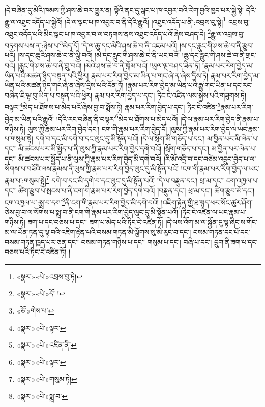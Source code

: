 །དེ་བཞིན་དུ་མེའི་ཁམས་ཀྱི་ཤས་ཆེ་བར་གྱུར་ན། ལྟོའི་ནང་དུ་ལྒང་པ་ཁ་འབྱར་བའི་རེག་བྱའི་ཁྱད་པར་སྐྱེ་སྟེ། དེའི་རྒྱུ་ལ་འཐུང་འདོད་པ་སྐྱེའོ། །དེ་ལ་ལྒང་པ་ཁ་འབྱར་བ་ནི་དེའི་རྒྱུའོ། །འཐུང་འདོད་པ་ནི་:འབྲས་བུ་སྟེ།\footnote{«སྣར་»«པེ་»འབྲས་བུ་ཏེ།} འབྲས་བུ་འཐུང་འདོད་པའི་མིང་ལྒང་པ་ཁ་འབྱར་བ་ལ་བཏགས་ནས་འཐུང་འདོད་པའོ་ཞེས་བཤད་དེ། \footnote{«སྣར་»«པེ་»དོ། ། }རྒྱུ་ལ་འབྲས་བུ་བཏགས་པས་ན་:ཉེས་པ་\footnote{«ཅོ་»གེས་པ་}མེད་དོ། །དེ་ལ་ཆུ་དང་མེའི་ཤས་ཆེ་བ་ནི་འཇམ་པའོ། །ས་དང་རླུང་གི་ཤས་ཆེ་བ་ནི་རྩུབ་པའོ། །ས་དང་ཆུའི་ཤས་ཆེ་བ་ནི་ལྕི་བའོ། །མེ་དང་རླུང་གི་ཤས་ཆེ་བ་ནི་ཡང་བའོ། །ཆུ་དང་རླུང་གི་ཤས་ཆེ་བ་ནི་གྲང་བའོ། །རླུང་གི་ཤས་ཆེ་བ་ནི་བྲུ་བའོ། །མེའི་ཤས་ཆེ་བ་ནི་སྐོམ་པའོ། །ཡུལ་ལྔ་བཤད་ཟིན་ཏོ། །རྣམ་པར་རིག་བྱེད་མ་ཡིན་པའི་མཚན་ཉིད་བསྟན་པའི་ཕྱིར། རྣམ་པར་རིག་བྱེད་མ་ཡིན་པ་གང་ཞེ་ན་ཞེས་དྲིས་ཏེ། རྣམ་པར་རིག་བྱེད་མ་ཡིན་པའི་མཚན་ཉིད་གང་ཞེ་ན་ཞེས་དྲིས་པའི་དོན་ཏོ། །རྣམ་པར་རིག་བྱེད་མ་ཡིན་པའི་རྒྱུ་གང་ཡིན་པ་དང་རང་བཞིན་ཇི་ལྟ་བུ་ཡིན་པ་བསྟན་པའི་ཕྱིར། རྣམ་པར་རིག་བྱེད་པ་དང་། ཏིང་ངེ་འཛིན་ལས་སྐྱེས་པའི་གཟུགས་ཏེ། བལྟར་\footnote{«སྣར་»«པེ་»ལྟར་}མེད་པ་ཐོགས་པ་མེད་པའོ་ཞེས་བྱ་བ་སྨོས་ཏེ། རྣམ་པར་རིག་བྱེད་པ་དང་། ཏིང་ངེ་འཛིན་\footnote{«སྣར་»«པེ་»འཛིན་ནི་}རྣམ་པར་རིག་བྱེད་མ་ཡིན་པའི་རྒྱུའོ། །དེའི་རང་བཞིན་ནི་བལྟར་\footnote{«སྣར་»«པེ་»ལྟར་}མེད་པ་ཐོགས་པ་མེད་པའོ། །དེ་ལ་རྣམ་པར་རིག་བྱེད་ནི་རྣམ་པ་གཉིས་ཏེ། ལུས་ཀྱི་རྣམ་པར་རིག་བྱེད་དང་། ངག་གི་རྣམ་པར་རིག་བྱེད་དོ། །ལུས་ཀྱི་རྣམ་པར་རིག་བྱེད་ལ་ཡང་རྣམ་པ་གསུམ་སྟེ། དགེ་བ་དང་མི་དགེ་བ་དང་ལུང་དུ་མི་སྟོན་པའོ། །དེ་ལ་སྲོག་མི་གཅོད་པ་དང་། མ་བྱིན་པར་མི་ལེན་པ་དང་། མི་ཚངས་པར་མི་སྤྱོད་པ་ནི་ལུས་ཀྱི་རྣམ་པར་རིག་བྱེད་དགེ་བའོ། །སྲོག་གཅོད་པ་དང་། མ་བྱིན་པར་ལེན་པ་དང་། མི་ཚངས་པར་སྤྱོད་པ་ནི་ལུས་ཀྱི་རྣམ་པར་རིག་བྱེད་མི་དགེ་བའོ། །རི་མོ་འདྲི་བ་དང་བཙེམ་འདྲུབ་བྱེད་པ་ལ་སོགས་པ་བཟོའི་ལས་རྣམས་ནི་ལུས་ཀྱི་རྣམ་པར་རིག་བྱེད་ལུང་དུ་མི་སྟོན་པའོ། །ངག་གི་རྣམ་པར་རིག་བྱེད་ལ་ཡང་རྣམ་པ་:གསུམ་སྟེ།\footnote{«སྣར་»«པེ་»གསུམ་ཏེ།} དགེ་བ་དང་མི་དགེ་བ་དང་ལུང་དུ་མི་སྟོན་པའོ། །དེ་ལ་བརྫུན་དང་། ཕྲ་མ་དང་། ངག་འཁྱལ་པ་དང་། ཚིག་རྩུབ་པོ་སྤངས་པ་ནི་ངག་གི་རྣམ་པར་རིག་བྱེད་དགེ་བའོ། །བརྫུན་དང་། ཕྲ་མ་དང་། ཚིག་རྩུབ་མོ་དང་། ངག་འཁྱལ་པ་:སྨྲ་བ་དག་\footnote{«སྣར་»«པེ་»སྨྲ་བ་}ནི་ངག་གི་རྣམ་པར་རིག་བྱེད་མི་དགེ་བའོ། །འཇིག་རྟེན་གྱི་ཐ་སྙད་ཕར་སོང་ཚུར་ཤོག་ཅེས་བྱ་བ་ལ་སོགས་པ་སྨྲ་བ་ནི་ངག་གི་རྣམ་པར་རིག་བྱེད་ལུང་དུ་མི་སྟོན་པའོ། །ཏིང་ངེ་འཛིན་ལ་ཡང་རྣམ་པ་གཉིས་ཏེ། ཟག་པ་དང་བཅས་པ་དང་། ཟག་པ་མེད་པའི་ཏིང་ངེ་འཛིན་ཏོ། །དེ་ལས་འོག་མ་ལ་སྐྱོན་དུ་ལྟ་ཞིང་ས་གོང་མ་ལ་ཡོན་ཏན་དུ་ལྟ་བའི་འཇིག་རྟེན་པའི་བསམ་གཏན་མི་ལྕོགས་སུ་མི་རུང་བ་དང་། བསམ་གཏན་དང་པོ་དང་བསམ་གཏན་ཁྱད་པར་ཅན་དང་། བསམ་གཏན་གཉིས་པ་དང་། གསུམ་པ་དང་། བཞི་པ་དང་། དྲུག་ནི་ཟག་པ་དང་བཅས་པའི་ཏིང་ངེ་འཛིན་ཏོ། །
